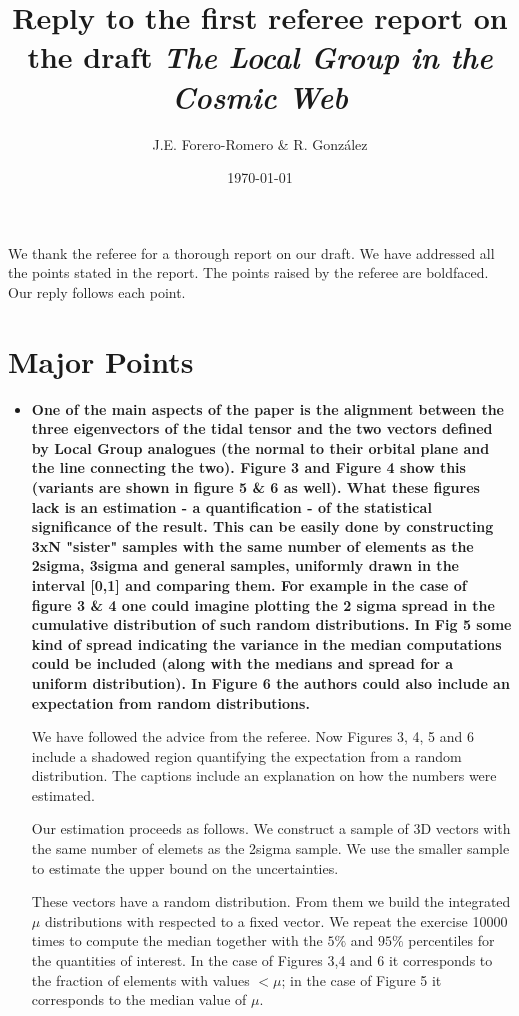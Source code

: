 \documentclass{article}
\title{Reply to the first referee report on the draft {\it The Local Group in the Cosmic Web}}
\author{J.E. Forero-Romero \& R. Gonz\'alez}
\date{\today}
\begin{document}
\maketitle

We thank the referee for a thorough report on our draft. We have
addressed all the points stated in the report. The points raised by
the referee are boldfaced. Our reply follows each point. 


\section{Major Points}

\begin{itemize}

\item
{\bf One of the main aspects of the paper is the alignment between the
  three eigenvectors of the tidal tensor and the two vectors defined
  by Local Group analogues (the normal to their orbital plane and the
  line connecting the two). Figure 3 and Figure 4 show this (variants
  are shown in figure 5 \& 6 as well). What these figures lack is an
  estimation - a quantification - of the statistical significance of
  the result. This can be easily done by constructing 3xN "sister"
  samples with the same number of elements as the 2sigma, 3sigma and
  general samples, uniformly drawn in the interval [0,1] and comparing
  them. For example in the case of figure 3 \& 4 one could imagine
  plotting the 2 sigma spread in the cumulative distribution of such
  random distributions. In Fig 5 some kind of spread indicating the
  variance in the median computations could be included (along with
  the medians and spread for a uniform distribution). In Figure 6 the
  authors could also include an expectation from random
  distributions.}  

We have followed the advice from the referee. Now Figures 3, 4, 5 and
6 include a shadowed region quantifying the expectation from a random
distribution. The captions include an explanation on how the numbers
were estimated. 

Our estimation proceeds as follows. We construct a sample of 3D
vectors with the same number of elemets as the 2sigma sample. We use
the smaller sample to estimate the upper bound on the uncertainties. 

These vectors have a random distribution. From them we build
the integrated $\mu$ distributions with respected to a fixed
vector. We repeat the exercise 10000 times to compute the median
together with the $5\%$ and $95\%$ percentiles for the quantities of
interest. In the case of Figures 3,4 and 6 it corresponds to the
fraction of elements with values $<\mu$; in the case of Figure 5 it
corresponds to the median value of $\mu$.  


\end{itemize}
\end{document}
